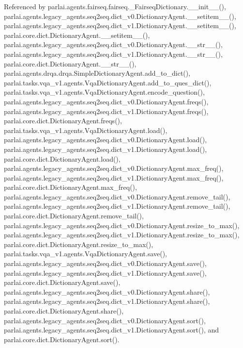 Referenced by parlai.\+agents.\+fairseq.\+fairseq.\+\_\+\+Fairseq\+Dictionary.\+\_\+\+\_\+init\+\_\+\+\_\+(), parlai.\+agents.\+legacy\+\_\+agents.\+seq2seq.\+dict\+\_\+v0.\+Dictionary\+Agent.\+\_\+\+\_\+setitem\+\_\+\+\_\+(), parlai.\+agents.\+legacy\+\_\+agents.\+seq2seq.\+dict\+\_\+v1.\+Dictionary\+Agent.\+\_\+\+\_\+setitem\+\_\+\+\_\+(), parlai.\+core.\+dict.\+Dictionary\+Agent.\+\_\+\+\_\+setitem\+\_\+\+\_\+(), parlai.\+agents.\+legacy\+\_\+agents.\+seq2seq.\+dict\+\_\+v0.\+Dictionary\+Agent.\+\_\+\+\_\+str\+\_\+\+\_\+(), parlai.\+agents.\+legacy\+\_\+agents.\+seq2seq.\+dict\+\_\+v1.\+Dictionary\+Agent.\+\_\+\+\_\+str\+\_\+\+\_\+(), parlai.\+core.\+dict.\+Dictionary\+Agent.\+\_\+\+\_\+str\+\_\+\+\_\+(), parlai.\+agents.\+drqa.\+drqa.\+Simple\+Dictionary\+Agent.\+add\+\_\+to\+\_\+dict(), parlai.\+tasks.\+vqa\+\_\+v1.\+agents.\+Vqa\+Dictionary\+Agent.\+add\+\_\+to\+\_\+ques\+\_\+dict(), parlai.\+tasks.\+vqa\+\_\+v1.\+agents.\+Vqa\+Dictionary\+Agent.\+encode\+\_\+question(), parlai.\+agents.\+legacy\+\_\+agents.\+seq2seq.\+dict\+\_\+v0.\+Dictionary\+Agent.\+freqs(), parlai.\+agents.\+legacy\+\_\+agents.\+seq2seq.\+dict\+\_\+v1.\+Dictionary\+Agent.\+freqs(), parlai.\+core.\+dict.\+Dictionary\+Agent.\+freqs(), parlai.\+tasks.\+vqa\+\_\+v1.\+agents.\+Vqa\+Dictionary\+Agent.\+load(), parlai.\+agents.\+legacy\+\_\+agents.\+seq2seq.\+dict\+\_\+v0.\+Dictionary\+Agent.\+load(), parlai.\+agents.\+legacy\+\_\+agents.\+seq2seq.\+dict\+\_\+v1.\+Dictionary\+Agent.\+load(), parlai.\+core.\+dict.\+Dictionary\+Agent.\+load(), parlai.\+agents.\+legacy\+\_\+agents.\+seq2seq.\+dict\+\_\+v0.\+Dictionary\+Agent.\+max\+\_\+freq(), parlai.\+agents.\+legacy\+\_\+agents.\+seq2seq.\+dict\+\_\+v1.\+Dictionary\+Agent.\+max\+\_\+freq(), parlai.\+core.\+dict.\+Dictionary\+Agent.\+max\+\_\+freq(), parlai.\+agents.\+legacy\+\_\+agents.\+seq2seq.\+dict\+\_\+v0.\+Dictionary\+Agent.\+remove\+\_\+tail(), parlai.\+agents.\+legacy\+\_\+agents.\+seq2seq.\+dict\+\_\+v1.\+Dictionary\+Agent.\+remove\+\_\+tail(), parlai.\+core.\+dict.\+Dictionary\+Agent.\+remove\+\_\+tail(), parlai.\+agents.\+legacy\+\_\+agents.\+seq2seq.\+dict\+\_\+v0.\+Dictionary\+Agent.\+resize\+\_\+to\+\_\+max(), parlai.\+agents.\+legacy\+\_\+agents.\+seq2seq.\+dict\+\_\+v1.\+Dictionary\+Agent.\+resize\+\_\+to\+\_\+max(), parlai.\+core.\+dict.\+Dictionary\+Agent.\+resize\+\_\+to\+\_\+max(), parlai.\+tasks.\+vqa\+\_\+v1.\+agents.\+Vqa\+Dictionary\+Agent.\+save(), parlai.\+agents.\+legacy\+\_\+agents.\+seq2seq.\+dict\+\_\+v0.\+Dictionary\+Agent.\+save(), parlai.\+agents.\+legacy\+\_\+agents.\+seq2seq.\+dict\+\_\+v1.\+Dictionary\+Agent.\+save(), parlai.\+core.\+dict.\+Dictionary\+Agent.\+save(), parlai.\+agents.\+legacy\+\_\+agents.\+seq2seq.\+dict\+\_\+v0.\+Dictionary\+Agent.\+share(), parlai.\+agents.\+legacy\+\_\+agents.\+seq2seq.\+dict\+\_\+v1.\+Dictionary\+Agent.\+share(), parlai.\+core.\+dict.\+Dictionary\+Agent.\+share(), parlai.\+agents.\+legacy\+\_\+agents.\+seq2seq.\+dict\+\_\+v0.\+Dictionary\+Agent.\+sort(), parlai.\+agents.\+legacy\+\_\+agents.\+seq2seq.\+dict\+\_\+v1.\+Dictionary\+Agent.\+sort(), and parlai.\+core.\+dict.\+Dictionary\+Agent.\+sort().

